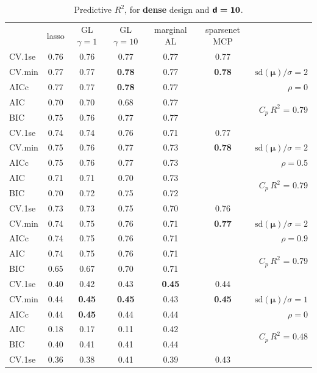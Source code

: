 \documentclass[12pt]{article}
\newcommand{\mr}[1]{\mathrm{#1}}
\newcommand{\bm}[1]{\mathbf{#1}}
\begin{document}
\begin{table}[p]\vspace{-.5cm}
\caption[l]{ Predictive $R^2$, for {\bf dense} design and  $\boldsymbol{{\sf d}=10}$.}
\vspace{-.5cm}
\small{}
\begin{center}
\begin{tabular}{l*{5}{c}|r}
 & lasso & GL $\gamma=1$ & GL $\gamma=10$ & marginal AL & sparsenet MCP  &  \\
\cline{1-7}
CV.1se & 0.76 & 0.76 & 0.77 & 0.77 & 0.77 &\\
CV.min & 0.77 & 0.77 & {\bf 0.78} & 0.77 & {\bf 0.78} &  $\mr{sd}(\bm{\mu})/\sigma=2$ \\
AICc & 0.77 & 0.77 & {\bf 0.78} & 0.77 & & $\rho=0$ \\
AIC & 0.70 & 0.70 & 0.68 & 0.77 & & \multirow{2}{*}{$C_p ~ R^2$ = 0.79} \\
BIC & 0.75 & 0.76 & 0.77 & 0.77 & & \\
 \hline 
CV.1se & 0.74 & 0.74 & 0.76 & 0.71 & 0.77 &\\
CV.min & 0.75 & 0.76 & 0.77 & 0.73 & {\bf 0.78} &  $\mr{sd}(\bm{\mu})/\sigma=2$ \\
AICc & 0.75 & 0.76 & 0.77 & 0.73 & & $\rho=0.5$ \\
AIC & 0.71 & 0.71 & 0.70 & 0.73 & & \multirow{2}{*}{$C_p ~ R^2$ = 0.79} \\
BIC & 0.70 & 0.72 & 0.75 & 0.72 & & \\
 \hline 
CV.1se & 0.73 & 0.73 & 0.75 & 0.70 & 0.76 &\\
CV.min & 0.74 & 0.75 & 0.76 & 0.71 & {\bf 0.77} &  $\mr{sd}(\bm{\mu})/\sigma=2$ \\
AICc & 0.74 & 0.75 & 0.76 & 0.71 & & $\rho=0.9$ \\
AIC & 0.74 & 0.75 & 0.76 & 0.71 & & \multirow{2}{*}{$C_p ~ R^2$ = 0.79} \\
BIC & 0.65 & 0.67 & 0.70 & 0.71 & & \\
 \hline 
CV.1se & 0.40 & 0.42 & 0.43 & {\bf 0.45} & 0.44 &\\
CV.min & 0.44 & {\bf 0.45} & {\bf 0.45} & 0.43 & {\bf 0.45} &  $\mr{sd}(\bm{\mu})/\sigma=1$ \\
AICc & 0.44 & {\bf 0.45} & 0.44 & 0.44 & & $\rho=0$ \\
AIC & 0.18 & 0.17 & 0.11 & 0.42 & & \multirow{2}{*}{$C_p ~ R^2$ = 0.48} \\
BIC & 0.40 & 0.41 & 0.41 & 0.44 & & \\
 \hline 
CV.1se & 0.36 & 0.38 & 0.41 & 0.39 & 0.43 &\\

\end{tabular}
\end{center}
\end{table}
\end{document}
